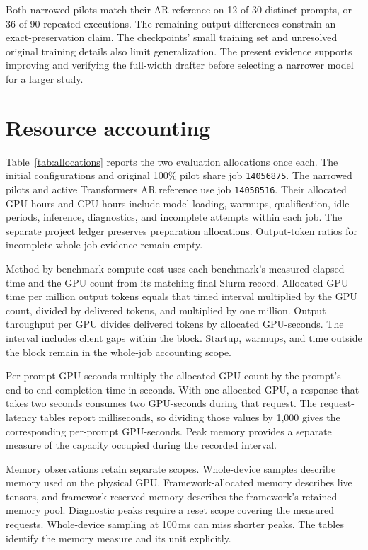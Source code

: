 \documentclass[conference,onecolumn]{IEEEtran}
\begin{document}
Both narrowed pilots match their AR reference on 12 of 30 distinct prompts, or 36 of 90 repeated executions. The remaining output differences constrain an exact-preservation claim. The checkpoints' small training set and unresolved original training details also limit generalization. The present evidence supports improving and verifying the full-width drafter before selecting a narrower model for a larger study.

\section{Resource accounting}
Table~\ref{tab:allocations} reports the two evaluation allocations once each. The initial configurations and original 100\% pilot share job \texttt{14056875}. The narrowed pilots and active Transformers AR reference use job \texttt{14058516}. Their allocated GPU-hours and CPU-hours include model loading, warmups, qualification, idle periods, inference, diagnostics, and incomplete attempts within each job. The separate project ledger preserves preparation allocations. Output-token ratios for incomplete whole-job evidence remain empty.

Method-by-benchmark compute cost uses each benchmark's measured elapsed time and the GPU count from its matching final Slurm record. Allocated GPU time per million output tokens equals that timed interval multiplied by the GPU count, divided by delivered tokens, and multiplied by one million. Output throughput per GPU divides delivered tokens by allocated GPU-seconds. The interval includes client gaps within the block. Startup, warmups, and time outside the block remain in the whole-job accounting scope.

Per-prompt GPU-seconds multiply the allocated GPU count by the prompt's end-to-end completion time in seconds. With one allocated GPU, a response that takes two seconds consumes two GPU-seconds during that request. The request-latency tables report milliseconds, so dividing those values by 1,000 gives the corresponding per-prompt GPU-seconds. Peak memory provides a separate measure of the capacity occupied during the recorded interval.

Memory observations retain separate scopes. Whole-device samples describe memory used on the physical GPU. Framework-allocated memory describes live tensors, and framework-reserved memory describes the framework's retained memory pool. Diagnostic peaks require a reset scope covering the measured requests. Whole-device sampling at 100\,ms can miss shorter peaks. The tables identify the memory measure and its unit explicitly.
\end{document}
